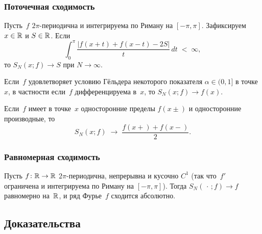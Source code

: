 \subsubsection*{Поточечная сходимость}

\begin{theorem}
\label{thm:dini}
Пусть~$f$ $2\pi$-периодична и интегрируема по Риману на $[-\pi, \pi]$.
Зафиксируем $x \in \mathbb{R}$ и $S \in \mathbb{R}$. Если
\[
  \int_{0}^{\pi} \frac{|f(x + t) + f(x - t) - 2S|}{t}\, dt \;<\; \infty,
\]
то $S_N(x; f) \to S$ при $N \to \infty$.
\end{theorem}

\begin{corollary}
\label{cor:dini-holder}
Если~$f$ удовлетворяет условию Гёльдера некоторого показателя
$\alpha \in (0, 1]$ в точке~$x$, в частности если~$f$ дифференцируема
в~$x$, то $S_N(x; f) \to f(x)$.
\end{corollary}

\begin{corollary}
\label{cor:jump}
Если~$f$ имеет в точке~$x$ односторонние пределы $f(x \pm)$ и
односторонние производные, то
\[
  S_N(x; f) \;\to\; \frac{f(x+) + f(x-)}{2}.
\]
\end{corollary}

\subsubsection*{Равномерная сходимость}

\begin{theorem}
\label{thm:uniform-c1}
Пусть $f \colon \mathbb{R} \to \mathbb{R}$ $2\pi$-периодична, непрерывна и кусочно $C^1$
(так что~$f'$ ограничена и интегрируема по Риману на $[-\pi, \pi]$).
Тогда $S_N(\,\cdot\,; f) \to f$ равномерно на~$\mathbb{R}$, и ряд Фурье~$f$
сходится абсолютно.
\end{theorem}

\subsection*{Доказательства}

